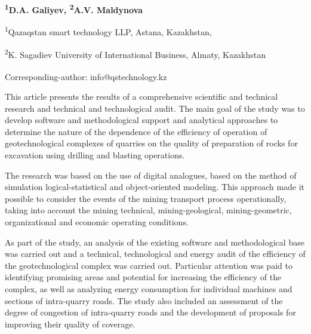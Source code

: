 \vspace{1em}
\begin{articleheader}

{\bfseries
\textsuperscript{1}D.A. Galiyev\textsuperscript{\envelope },
\textsuperscript{2}A.V. Maldynova
}
\end{articleheader}

\begin{affiliation}
\textsuperscript{1}Qazaqstan smart technology LLP, Astana, Kazakhstan,

\textsuperscript{2}K. Sagadiev University of International Business, Almaty, Kazakhstan

\raggedright \textsuperscript{\envelope }Corresponding-author: info@qstechnology.kz
\end{affiliation}

This article presents the results of a comprehensive scientific and
technical research and technical and technological audit. The main goal
of the study was to develop software and methodological support and
analytical approaches to determine the nature of the dependence of the
efficiency of operation of geotechnological complexes of quarries on the
quality of preparation of rocks for excavation using drilling and
blasting operations.

The research was based on the use of digital analogues, based on the
method of simulation logical-statistical and object-oriented modeling.
This approach made it possible to consider the events of the mining
transport process operationally, taking into account the mining
technical, mining-geological, mining-geometric, organizational and
economic operating conditions.

As part of the study, an analysis of the existing software and
methodological base was carried out and a technical, technological and
energy audit of the efficiency of the geotechnological complex was
carried out. Particular attention was paid to identifying promising
areas and potential for increasing the efficiency of the complex, as
well as analyzing energy consumption for individual machines and
sections of intra-quarry roads. The study also included an assessment of
the degree of congestion of intra-quarry roads and the development of
proposals for improving their quality of coverage.

